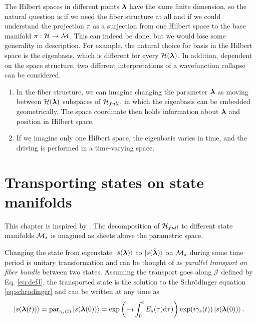 The Hilbert spaces in different points ${\bm\lambda}$ have the same finite dimension, so the natural question is if we need the fiber structure at all and if we could understand the projection $\pi$ as a surjection from one Hilbert space to the base manifold $\pi: \mathcal{H}\rightarrow \mathcal{M}$. This can indeed be done, but we would lose some generality in description. For example, the natural choice for basis in the Hilbert space is the eigenbasis, which is different for every $\mathcal{H}({\bm\lambda})$. In addition, dependent on the space structure, two different interpretations of a wavefunction collapse can be considered.
\begin{enumerate}
    \item In the fiber structure, we can imagine changing the parameter ${\bm\lambda}$ as moving between $\mathcal{H}({\bm\lambda})$ subspaces of $\mathcal{H}_{full}$, in which the eigenbasis can be embedded geometrically. The space coordinate then holds information about ${\bm\lambda}$ and position in Hilbert space. 
    \item If we imagine only one Hilbert space, the eigenbasis varies in time, and the driving is performed in a time-varying space.
\end{enumerate}







\section{Transporting states on state manifolds}
This chapter is inspired by \citet{berry1984}. The decomposition of $\mathcal{H}_{full}$ to different state manifolds $\mathcal{M}_s$ is imagined as sheets above the parametric space. 


Changing the state from eigenstate $\ket{s({\bm\lambda})}$ to $\ket{s(\tilde{{\bm\lambda}})}$ on $\mathcal{M}_s$ during some time period is unitary transformation and can be thought of as \emph{parallel transport on fiber bundle} between two states. Assuming the transport goes along $\mathcal J$ defined by Eq. \ref{eq:defJ}, the transported state is the solution to the Schr\"odinger equation \ref{eq:schrodinger} and can be written at any time as
\begin{equation}
    \hspace{-5pt}\ket{s({\bm\lambda}(t))} = \textrm{par}_{\gamma_s(t)}\ket{s({\bm\lambda}(0))} = \exp\left(-i\int_0^tE_s(\tau)\mathrm{d}\tau)\right)\exp(i\gamma_s(t))\ket{s({\bm\lambda}(0))}.
    \label{eq:phasesOnManifold}
\end{equation}


